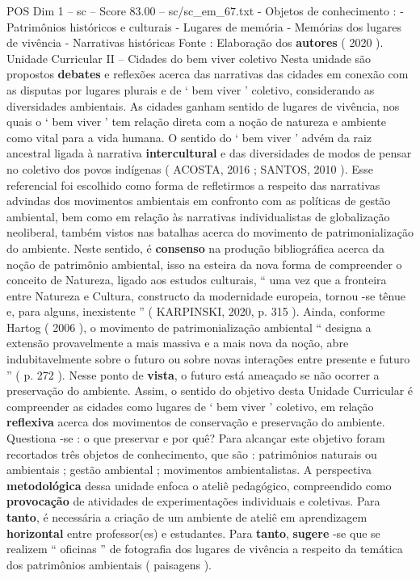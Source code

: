 \begin{textsample}{POS Dim 1 – sc – Score 83.00 – sc/sc\_em\_67.txt}
- Objetos de conhecimento : - Patrimônios históricos e culturais - Lugares de memória - Memórias dos lugares de vivência - Narrativas históricas Fonte : Elaboração dos \textbf{autores} ( 2020 ).
Unidade Curricular II – Cidades do bem viver coletivo Nesta unidade são propostos \textbf{debates} e reflexões acerca das narrativas das cidades em conexão com as disputas por lugares plurais e de ‘ bem viver ’ coletivo, considerando as diversidades ambientais.
As cidades ganham sentido de lugares de vivência, nos quais o ‘ bem viver ’ tem relação direta com a noção de natureza e ambiente como vital para a vida humana.
O sentido do ‘ bem viver ’ advém da raiz ancestral ligada à narrativa \textbf{intercultural} e das diversidades de modos de pensar no coletivo dos povos indígenas ( ACOSTA, 2016 ; SANTOS, 2010 ).
Esse referencial foi escolhido como forma de refletirmos a respeito das narrativas advindas dos movimentos ambientais em confronto com as políticas de gestão ambiental, bem como em relação às narrativas individualistas de globalização neoliberal, também vistos nas batalhas acerca do movimento de patrimonialização do ambiente.
Neste sentido, é \textbf{consenso} na produção bibliográfica acerca da noção de patrimônio ambiental, isso na esteira da nova forma de compreender o conceito de Natureza, ligado aos estudos culturais, “ uma vez que a fronteira entre Natureza e Cultura, constructo da modernidade europeia, tornou -se tênue e, para alguns, inexistente ” ( KARPINSKI, 2020, p. 315 ).
Ainda, conforme Hartog ( 2006 ), o movimento de patrimonialização ambiental “ designa a extensão provavelmente a mais massiva e a mais nova da noção, abre indubitavelmente sobre o futuro ou sobre novas interações entre presente e futuro ” ( p. 272 ).
Nesse ponto de \textbf{vista}, o futuro está ameaçado se não ocorrer a preservação do ambiente.
Assim, o sentido do objetivo desta Unidade Curricular é compreender as cidades como lugares de ‘ bem viver ’ coletivo, em relação \textbf{reflexiva} acerca dos movimentos de conservação e preservação do ambiente.
Questiona -se : o que preservar e por quê?
Para alcançar este objetivo foram recortados três objetos de conhecimento, que são : patrimônios naturais ou ambientais ; gestão ambiental ; movimentos ambientalistas.
A perspectiva \textbf{metodológica} dessa unidade enfoca o ateliê pedagógico, compreendido como \textbf{provocação} de atividades de experimentações individuais e coletivas.
Para \textbf{tanto}, é necessária a criação de um ambiente de ateliê em aprendizagem \textbf{horizontal} entre professor(es) e estudantes.
Para \textbf{tanto}, \textbf{sugere} -se que se realizem “ oficinas ” de fotografia dos lugares de vivência a respeito da temática dos patrimônios ambientais ( paisagens ).

\end{textsample}

